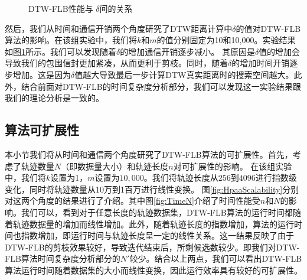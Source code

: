   \begin{figure}
  	\centering
  	\caption{DTW-FLB性能与 $\delta$间的关系}
  	\label{fig:DeltaImpact}
  \end{figure}
  
  然后，我们从时间和通信开销两个角度研究了DTW距离计算中$\delta$的值对DTW-FLB算法的影响。在该组实验中，我们将$k$和$m$的值分别固定为10和10,000。实验结果如图\ref{fig:DeltaImpact}所示。我们可以发现随着$\delta$的增加通信开销逐步减小。
  其原因是$\delta$值的增加会导致我们的包围信封更加紧凑，从而更利于剪枝。同时，随着$\delta$的增加时间开销逐步增加。这是因为$\delta$值越大导致最后一步计算DTW真实距离时的搜索空间越大。此外，结合前面对DTW-FLB的时间复杂度分析部分，我们可以发现这一实验结果跟我们的理论分析是一致的。
  
 \subsection{算法可扩展性}

  本小节我们将从时间和通信两个角度研究了DTW-FLB算法的可扩展性。首先，考虑了轨迹数量$N$（即数据量大小）和轨迹长度$n$对可扩展性的影响。
  在该组实验中，我们将$k$设置为1，$m$设置为$10,000$。我们将轨迹长度从$256$到$4096$进行指数级变化，同时将轨迹数量从10万到1百万进行线性变换。
  图\ref{fig:HpaaScalability}分别对这两个角度的结果进行了介绍。其中图\ref{fig:TimeN}介绍了时间性能受$n$和$N$的影响。我们可以，看到对于任意长度的轨迹数据集，DTW-FLB算法的运行时间都随着轨迹数据量的增加而线性增加。此外，随着轨迹长度的指数增加，算法的运行时间也指数增加，即运行时间与轨迹长度呈一定的线性关系。这一结果反映了由于DTW-FLB的剪枝效果较好，导致迭代结束后，所剩候选数较少。即我们对DTW-FLB算法时间复杂度分析部分的$N'$较少。结合以上两点，我们可以看出DTW-FLB算法运行时间随着数据集的大小而线性变换，因此运行效率具有较好的可扩展性。
  
